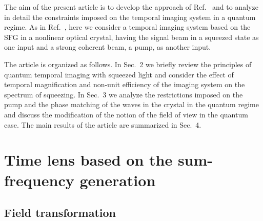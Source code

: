 \documentclass[10pt,twocolumn]{article}
\begin{document}
The aim of the present article is to develop the approach of Ref.~\cite{Patera2015} and to analyze in detail the constraints imposed on the temporal imaging system in a quantum regime. As in Ref.~\cite{Patera2015}, here we consider a temporal imaging system based on the SFG in a nonlinear optical crystal, having the signal beam in a squeezed state as one input and a strong coherent beam, a pump, as another input.

The article is organized as follows. In Sec.~2 we briefly review the principles of quantum temporal imaging with squeezed light and consider the effect of temporal magnification and non-unit efficiency of the imaging system on the spectrum of squeezing. In Sec.~3 we  analyze the restrictions imposed on the pump and the phase matching of the waves in the crystal in the quantum regime and discuss the modification of the notion of the field of view in the quantum case. The main results of the article are summarized in Sec.~4.

\section{Time lens based on the sum-frequency generation}

\subsection{Field transformation}
\end{document}
